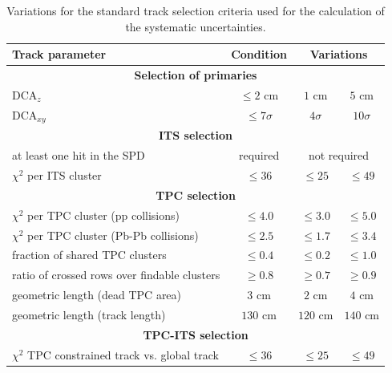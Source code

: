 \documentclass[12pt,a4paper]{report}
\begin{document}
\begin{table}[tb!]
\renewcommand{\arraystretch}{1.5}
\centering
\begin{tabular}{l c c c}
\toprule
\rowcolor{headerBlue}  \textbf{Track parameter} &  \textbf{Condition}  &  \multicolumn{2}{c}{\textbf{Variations}} \\
\midrule
\multicolumn{4}{c}{\textbf{Selection of primaries}} \\
\midrule
$\text{DCA}_{z}$ & $\leq 2 $ cm & $1$ cm & $5$ cm\\
$\text{DCA}_{xy}$ & $\leq 7\sigma$ & $4\sigma$ & $10\sigma$ \\
\midrule
\multicolumn{4}{c}{\textbf{ITS selection}} \\
\midrule
at least one hit in the SPD & required  & \multicolumn{2}{c}{not required}\\
$\chi^2$ per ITS cluster  & $\leq 36$ & $\leq 25$ & $\leq 49$ \\
\midrule
\multicolumn{4}{c}{\textbf{TPC selection}} \\
\midrule
$\chi^2$ per TPC cluster (pp collisions) & $\leq 4.0$  & $\leq 3.0$ & $\leq 5.0$\\
$\chi^2$ per TPC cluster (Pb-Pb collisions) & $\leq 2.5$ & $\leq 1.7$ & $\leq 3.4$\\
fraction of shared  TPC clusters&  $\leq 0.4$  & $\leq 0.2$ & $\leq 1.0$ \\
ratio of crossed rows over findable clusters  & $\geq 0.8$ & $\geq 0.7$ & $\geq 0.9$\\
geometric length (dead TPC area) & $3$ cm & $2$ cm & $4$ cm \\
geometric length (track length) & $130$ cm & $120$ cm & $140$ cm\\

\midrule
\multicolumn{4}{c}{\textbf{TPC-ITS selection}} \\
\midrule
$\chi^2$ TPC constrained track vs. global track  & $\leq 36$ & $\leq 25$ & $\leq 49$ \\
\bottomrule
\end{tabular}
\caption{Variations for the standard track selection criteria used for the calculation of the systematic uncertainties.}
\label{tab:curVar}
\end{table}
\end{document}
